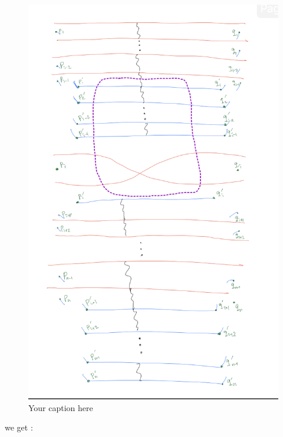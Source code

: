 \begin{figure}[H] %
    \centering
    \includegraphics[width=\linewidth]{diagrams/definition12/13.png} %
    \caption{Your caption here}
    \label{fig:your-label}
\end{figure}

we get :

